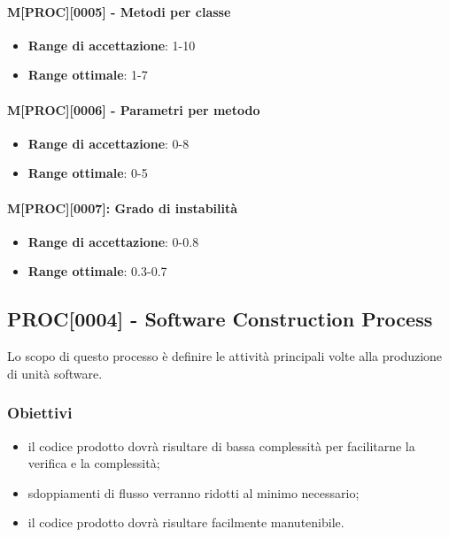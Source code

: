 \paragraph{M[PROC][0005] - Metodi per classe}
\begin{itemize}
    \item \textbf{Range di accettazione}: 1-10
    \item \textbf{Range ottimale}: 1-7
\end{itemize}

\paragraph{M[PROC][0006] - Parametri per metodo} 
\begin{itemize}
    \item \textbf{Range di accettazione}: 0-8
    \item \textbf{Range ottimale}: 0-5
\end{itemize}


\paragraph{M[PROC][0007]: Grado di instabilità}
\begin{itemize}
    \item \textbf{Range di accettazione}: 0-0.8
    \item \textbf{Range ottimale}: 0.3-0.7
    \end{itemize}
    
\subsection{PROC[0004] - Software Construction Process}
Lo scopo di questo processo è definire le attività principali volte alla produzione di unità software.

\subsubsection{Obiettivi}
\begin{itemize}
    \item il codice prodotto dovrà risultare di bassa complessità per facilitarne la verifica e la complessità;
    \item sdoppiamenti di flusso verranno ridotti al minimo necessario;
    \item il codice prodotto dovrà risultare facilmente manutenibile.
\end{itemize}

